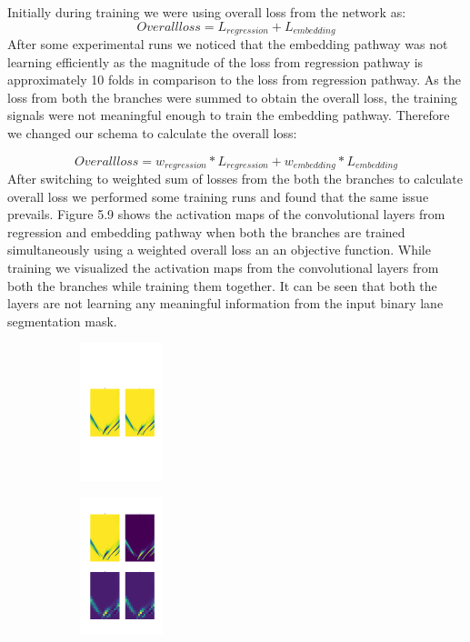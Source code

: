 Initially during training we were using overall loss from the network as: 
\begin{equation}
    Overall loss = L_{regression} + L_{embedding} 
\end{equation}
After some experimental runs we noticed that the embedding pathway was not learning efficiently as the magnitude of the loss from regression pathway is approximately 10 folds in comparison to the loss from regression pathway. As the loss from both the branches were summed to obtain the overall loss, the training signals were not meaningful enough to train the embedding pathway. Therefore we changed our schema to calculate the overall loss:

\begin{equation}
    Overall loss = w_{regression} * L_{regression} + w_{embedding} * L_{embedding} 
\end{equation}
 After switching to weighted sum of losses from the both the branches to calculate overall loss we performed some training runs and found that the same issue prevails. Figure 5.9 shows the activation maps of the convolutional layers from regression and embedding pathway when both the branches are trained simultaneously using a weighted overall loss an an objective function. While training we visualized the activation maps from the convolutional layers from both the branches while training them together. It can be seen that both the layers are not learning any meaningful information from the input binary lane segmentation mask.  
 
 \begin{figure}[h]
      \caption{Activation maps of convolutional layers (a) embedding pathway (b) regression pathway, while training them simultaneously}
        \centering
        \begin{subfigure}{0.5\textwidth}
        \includegraphics[width=1\linewidth, height=4cm]{images/activation_embededing_nofix.png} 
        \caption{}
        \label{fig:subim1}
        \end{subfigure}
        \begin{subfigure}{0.5\textwidth}
        \includegraphics[width=1\linewidth,height=4cm]{images/embedding_regression_nofix.png}
        \caption{}
        \label{fig:subim2}
        \end{subfigure}
        \end{figure}

